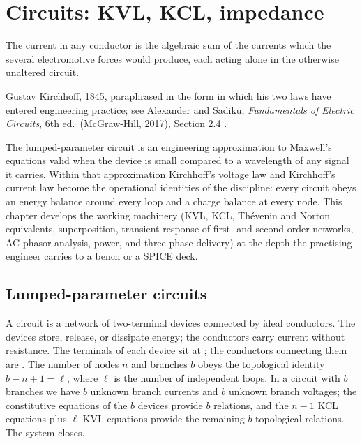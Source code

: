 \chapter{Circuits: KVL, KCL, impedance}
\label{vol04:ch09}

\epigraph{The current in any conductor is the algebraic sum of the
currents which the several electromotive forces would produce, each
acting alone in the otherwise unaltered circuit.}{Gustav Kirchhoff,
1845, paraphrased in the form in which his two laws have entered
engineering practice; see Alexander and Sadiku, \emph{Fundamentals of
Electric Circuits}, 6th ed.\ (McGraw-Hill, 2017), Section 2.4
\cite[Section~2.4]{text:alexander-sadiku-circuits}.}


\noindent
The lumped-parameter circuit is an engineering approximation to
Maxwell's equations valid when the device is small compared to a
wavelength of any signal it carries. Within that approximation
Kirchhoff's voltage law and Kirchhoff's current law become the
operational identities of the discipline: every circuit obeys an
energy balance around every loop and a charge balance at every node.
This chapter develops the working machinery (KVL, KCL, Th\'evenin and
Norton equivalents, superposition, transient response of first- and
second-order networks, AC phasor analysis, power, and three-phase
delivery) at the depth the practising engineer carries to a bench or
a SPICE deck.

\section{Lumped-parameter circuits}

A circuit is a network of two-terminal devices connected by ideal
conductors. The devices store, release, or dissipate energy; the
conductors carry current without resistance. The terminals of each
device sit at ; the conductors connecting them are
. The number of nodes $n$ and branches $b$ obeys
the topological identity $b - n + 1 = \ell$, where $\ell$ is the
number of independent loops. In a circuit with $b$ branches we have
$b$ unknown branch currents and $b$ unknown branch voltages; the
constitutive equations of the $b$ devices provide $b$ relations, and
the $n-1$ KCL equations plus $\ell$ KVL equations provide the
remaining $b$ topological relations. The system closes.

